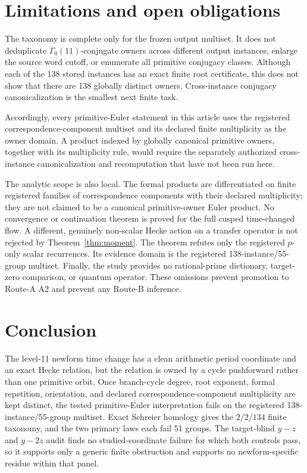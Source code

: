 \documentclass[11pt]{article}
\theoremstyle{definition}
\theoremstyle{remark}
\newcommand{\G}{\Gamma_0(11)}
\begin{document}
\section{Limitations and open obligations}

The taxonomy is complete only for the frozen output multiset. It does not deduplicate $\G$-conjugate owners across different output instances, enlarge the source word cutoff, or enumerate all primitive conjugacy classes. Although each of the 138 stored instances has an exact finite root certificate, this does not show that there are 138 globally distinct owners. Cross-instance conjugacy canonicalization is the smallest next finite task.

Accordingly, every primitive-Euler statement in this article uses the registered correspondence-component multiset and its declared finite multiplicity as the owner domain. A product indexed by globally canonical primitive owners, together with its multiplicity rule, would require the separately authorized cross-instance canonicalization and recomputation that have not been run here.

The analytic scope is also local. The formal products are differentiated on finite registered families of correspondence components with their declared multiplicity; they are not claimed to be a canonical primitive-owner Euler product. No convergence or continuation theorem is proved for the full cusped time-changed flow. A different, genuinely non-scalar Hecke action on a transfer operator is not rejected by Theorem~\ref{thm:moment}. The theorem refutes only the registered $p$-only scalar recurrences. Its evidence domain is the registered 138-instance/55-group multiset. Finally, the study provides no rational-prime dictionary, target-zero comparison, or quantum operator. These omissions prevent promotion to Route-A A2 and prevent any Route-B inference.

\section{Conclusion}

The level-11 newform time change has a clean arithmetic period coordinate and an exact Hecke relation, but the relation is owned by a cycle pushforward rather than one primitive orbit. Once branch-cycle degree, root exponent, formal repetition, orientation, and declared correspondence-component multiplicity are kept distinct, the tested primitive-Euler interpretation fails on the registered 138-instance/55-group multiset. Exact Schreier homology gives the $2/2/134$ finite taxonomy, and the two primary laws each fail 51 groups. The target-blind $y-z$ and $y-2z$ audit finds no studied-coordinate failure for which both controls pass, so it supports only a generic finite obstruction and supports no newform-specific residue within that panel.
\end{document}
